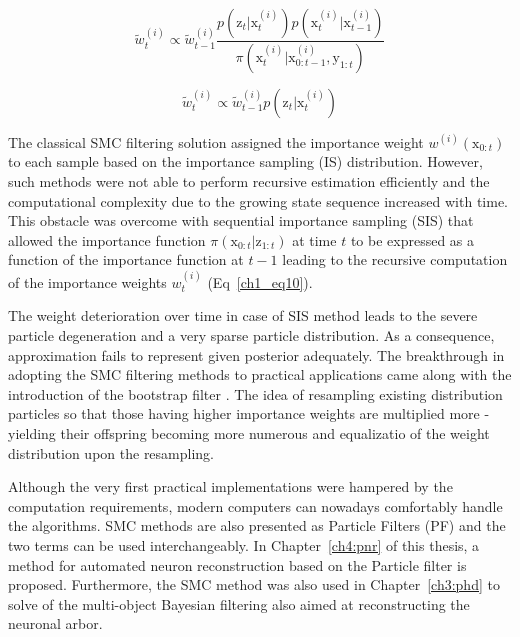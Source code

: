 \begin{equation}
\tilde{w}_{t}^{(i)} \propto \tilde{w}_{t-1}^{(i)} \frac{p(\mathrm{z}_t | \mathrm{x}_{t}^{(i)}) p(\mathrm{x}_{t}^{(i)} | \mathrm{x}_{t-1}^{(i)} )}{ \pi(\mathrm{x}_{t}^{(i)} | \mathrm{x}_{0:t-1}^{(i)}, \mathrm{y}_{1:t}) }
\label{ch1_eq10}
\end{equation}

\begin{equation}
\tilde{w}_{t}^{(i)} \propto \tilde{w}_{t-1}^{(i)} p(\mathrm{z}_t | \mathrm{x}_{t}^{(i)})
\label{ch1_eq11}
\end{equation}

The classical SMC filtering solution assigned the importance weight $w^{(i)}(\mathrm{x}_{0:t})$ to each sample based on the importance sampling (IS) distribution. However, such methods were not able to perform recursive estimation efficiently and the computational complexity due to the growing state sequence increased with time. This obstacle was overcome with sequential importance sampling (SIS) that allowed the importance function $\pi(\mathrm{x}_{0:t} | \mathrm{z}_{1:t})$ at time $t$ to be expressed as a function of the importance function at $t-1$ leading to the recursive computation of the importance weights $w_{t}^{(i)}$ (Eq~\ref{ch1_eq10}).

The weight deterioration over time in case of SIS method leads to the severe particle degeneration and a very sparse particle distribution. As a consequence, approximation fails to represent given posterior adequately. The breakthrough in adopting the SMC filtering methods to practical applications came along with the introduction of the bootstrap filter \cite{gordon1993novel}. The idea of resampling existing distribution particles so that those having higher importance weights are multiplied more - yielding their offspring becoming more numerous and equalizatio of the weight distribution upon the resampling.

Although the very first practical implementations were hampered by the computation requirements, modern computers can nowadays comfortably handle the algorithms. SMC methods are also presented as Particle Filters (PF) and the two terms can be used interchangeably. In Chapter~\ref{ch4:pnr} of this thesis, a method for automated neuron reconstruction based on the Particle filter is proposed. Furthermore, the SMC method was also used in Chapter~\ref{ch3:phd} to solve of the multi-object Bayesian filtering also aimed at reconstructing the neuronal arbor. 

